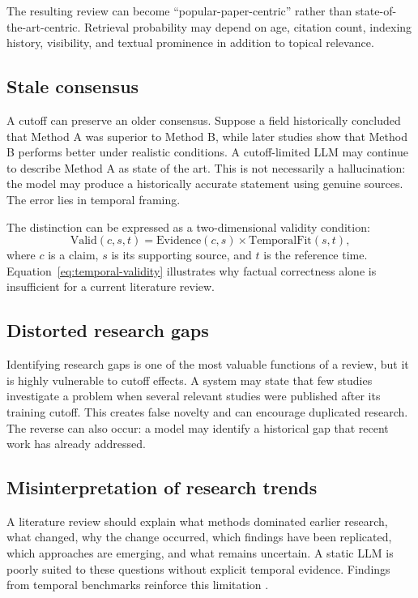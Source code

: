 \documentclass[manuscript,screen]{acmart}
\begin{document}
The resulting review can become ``popular-paper-centric'' rather than state-of-the-art-centric. Retrieval
probability may depend on age, citation count, indexing history, visibility, and textual prominence in addition
to topical relevance.

\subsection{Stale consensus}\label{subsec:stale}
A cutoff can preserve an older consensus. Suppose a field historically concluded that Method A was superior
to Method B, while later studies show that Method B performs better under realistic conditions. A cutoff-limited
LLM may continue to describe Method A as state of the art. This is not necessarily a hallucination: the model
may produce a historically accurate statement using genuine sources. The error lies in temporal framing.

The distinction can be expressed as a two-dimensional validity condition:
\begin{equation}
    \mathrm{Valid}(c,s,t)=\mathrm{Evidence}(c,s)\times\mathrm{TemporalFit}(s,t),
    \label{eq:temporal-validity}
\end{equation}
where $c$ is a claim, $s$ is its supporting source, and $t$ is the reference time. Equation~\eqref{eq:temporal-validity}
illustrates why factual correctness alone is insufficient for a current literature review.

\subsection{Distorted research gaps}\label{subsec:gapsdistorted}
Identifying research gaps is one of the most valuable functions of a review, but it is highly vulnerable to
cutoff effects. A system may state that few studies investigate a problem when several relevant studies were
published after its training cutoff. This creates false novelty and can encourage duplicated research. The
reverse can also occur: a model may identify a historical gap that recent work has already addressed.

\subsection{Misinterpretation of research trends}\label{subsec:trends}
A literature review should explain what methods dominated earlier research, what changed, why the change
occurred, which findings have been replicated, which approaches are emerging, and what remains uncertain.
A static LLM is poorly suited to these questions without explicit temporal evidence. Findings from temporal
benchmarks reinforce this limitation \cite{kim2024,zhu2025}.
\end{document}
